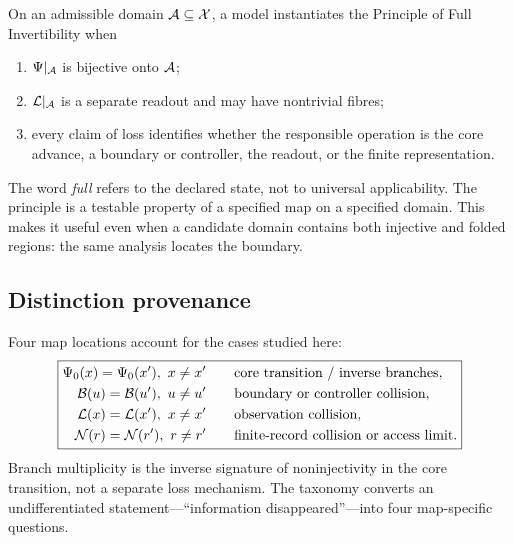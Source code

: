 \begin{principle}
\label{principle:full-invertibility}
On an admissible domain \(\mathcal A\subseteq\mathcal X\), a model instantiates the Principle of Full Invertibility when
\begin{enumerate}
\item \(\Psi|_{\mathcal A}\) is bijective onto \(\mathcal A\);
\item \(\mathcal L|_{\mathcal A}\) is a separate readout and may have nontrivial fibres;
\item every claim of loss identifies whether the responsible operation is the core advance, a boundary or controller, the readout, or the finite representation.
\end{enumerate}
\end{principle}

The word \emph{full} refers to the declared state, not to universal applicability. The principle is a testable property of a specified map on a specified domain. This makes it useful even when a candidate domain contains both injective and folded regions: the same analysis locates the boundary.

\subsection{Distinction provenance}

Four map locations account for the cases studied here:
\begin{equation}
\boxed{
\begin{aligned}
\Psi_0(x)=\Psi_0(x'),\ x\neq x'
&\quad &&\text{core transition / inverse branches},\\
\mathcal B(u)=\mathcal B(u'),\ u\neq u'
&&&\text{boundary or controller collision},\\
\mathcal L(x)=\mathcal L(x'),\ x\neq x'
&&&\text{observation collision},\\
\mathcal N(r)=\mathcal N(r'),\ r\neq r'
&&&\text{finite-record collision or access limit}.
\end{aligned}}
\label{eq:provenance-taxonomy}
\end{equation}
Branch multiplicity is the inverse signature of noninjectivity in the core transition, not a separate loss mechanism. The taxonomy converts an undifferentiated statement---``information disappeared''---into four map-specific questions.

